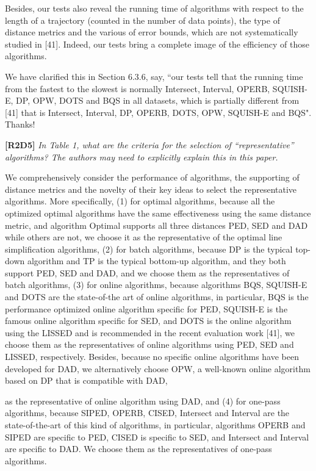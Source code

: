 \documentclass{letter}
\begin{document}
{{Besides, our tests also reveal the running time of algorithms with respect to the length of a trajectory (counted in the number of data points), the type of distance metrics and the various of error bounds, which are not systematically studied in [41]. Indeed, our tests bring a complete image of the efficiency of those algorithms.



We have clarified this in Section 6.3.6, say, ``our tests tell that the running time from the fastest to the slowest is normally Intersect, Interval, OPERB, SQUISH-E, DP, OPW, DOTS and BQS in all datasets, which is partially different from [41] that is Intersect, Interval, DP, OPERB, DOTS, OPW, SQUISH-E and BQS". Thanks!




\textbf{[R2D5]} \emph{In Table 1, what are the criteria for the selection of “representative” algorithms? The authors may need to explicitly explain this in this paper.}

We comprehensively consider the performance of algorithms, the supporting of distance metrics and the novelty of their key ideas to select the representative algorithms. More specifically, 
(1) for optimal algorithms, {because all the optimized optimal algorithms have the same effectiveness using the same distance metric, and algorithm Optimal supports all three distances PED, SED and DAD while others are not, we choose it as the representative of the optimal line simplification algorithms,}
%
(2) for batch algorithms, {because DP is the typical top-down algorithm and TP is the typical bottom-up algorithm, and they both support PED, SED and DAD, and we choose  them as the representatives of batch algorithms,}
%
(3) for online algorithms, because algorithms BQS, SQUISH-E and DOTS are the state-of-the art of online algorithms, in particular, BQS is the performance optimized online algorithm specific for PED, SQUISH-E is the famous online algorithm specific for SED, and {DOTS is the online algorithm using the LISSED and is recommended in the recent evaluation work [41]}, we choose them as the representatives of online algorithms using PED, SED and {LISSED}, respectively. Besides, because no specific online algorithms have been developed for DAD, we alternatively choose OPW, a well-known online algorithm based on DP that is compatible with DAD,} as the representative of online algorithm using DAD, and
%
(4) for one-pass algorithms, because SIPED, OPERB, CISED, Intersect and Interval are the state-of-the-art of this kind of algorithms, in particular, algorithms OPERB and SIPED are specific to PED, CISED is specific to SED, and Intersect and Interval are specific to DAD. We choose them as the representatives of one-pass algorithms.

}
\end{document}
